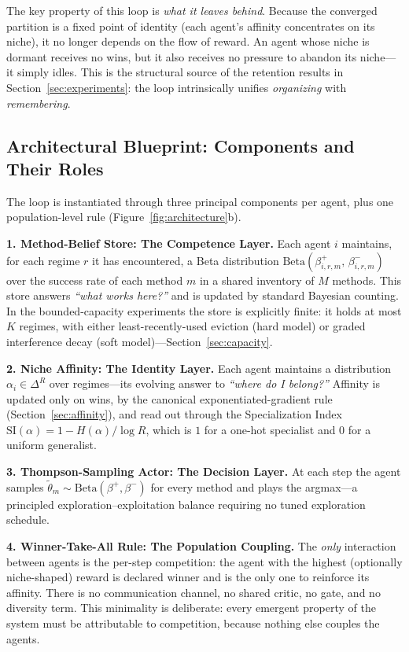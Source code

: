 \documentclass[10pt]{article}
\newcommand{\SI}{\mathrm{SI}}
\begin{document}
The key property of this loop is \emph{what it leaves behind}. Because the
converged partition is a fixed point of identity (each agent's affinity
concentrates on its niche), it no longer depends on the flow of reward. An agent
whose niche is dormant receives no wins, but it also receives no pressure to
abandon its niche---it simply idles. This is the structural source of the
retention results in Section~\ref{sec:experiments}: the loop intrinsically
unifies \emph{organizing} with \emph{remembering}.

\subsection{Architectural Blueprint: Components and Their Roles}

The loop is instantiated through three principal components per agent, plus one
population-level rule (Figure~\ref{fig:architecture}b).

\textbf{1. Method-Belief Store: The Competence Layer.} Each agent $i$ maintains,
for each regime $r$ it has encountered, a Beta distribution
$\mathrm{Beta}(\beta^{+}_{i,r,m},\, \beta^{-}_{i,r,m})$ over the success rate of
each method $m$ in a shared inventory of $M$ methods. This store answers
\emph{``what works here?''} and is updated by standard Bayesian counting. In the
bounded-capacity experiments the store is explicitly finite: it holds at most
$K$ regimes, with either least-recently-used eviction (hard model) or graded
interference decay (soft model)---Section~\ref{sec:capacity}.

\textbf{2. Niche Affinity: The Identity Layer.} Each agent maintains a
distribution $\alpha_i \in \Delta^R$ over regimes---its evolving answer to
\emph{``where do I belong?''} Affinity is updated only on wins, by the canonical
exponentiated-gradient rule (Section~\ref{sec:affinity}), and read out through
the Specialization Index $\SI(\alpha) = 1 - H(\alpha)/\log R$, which is $1$ for
a one-hot specialist and $0$ for a uniform generalist.

\textbf{3. Thompson-Sampling Actor: The Decision Layer.} At each step the agent
samples $\tilde{\theta}_m \sim \mathrm{Beta}(\beta^{+},\beta^{-})$ for every
method and plays the argmax---a principled exploration--exploitation balance
requiring no tuned exploration schedule.

\textbf{4. Winner-Take-All Rule: The Population Coupling.} The \emph{only}
interaction between agents is the per-step competition: the agent with the
highest (optionally niche-shaped) reward is declared winner and is the only one
to reinforce its affinity. There is no communication channel, no shared critic,
no gate, and no diversity term. This minimality is deliberate: every emergent
property of the system must be attributable to competition, because nothing else
couples the agents.
\end{document}
